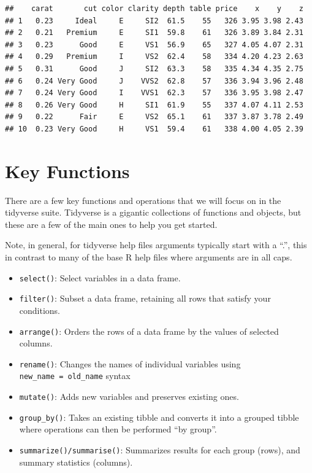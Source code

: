 \documentclass[
]{book}
\begin{document}
\begin{verbatim}
##    carat       cut color clarity depth table price    x    y    z
## 1   0.23     Ideal     E     SI2  61.5    55   326 3.95 3.98 2.43
## 2   0.21   Premium     E     SI1  59.8    61   326 3.89 3.84 2.31
## 3   0.23      Good     E     VS1  56.9    65   327 4.05 4.07 2.31
## 4   0.29   Premium     I     VS2  62.4    58   334 4.20 4.23 2.63
## 5   0.31      Good     J     SI2  63.3    58   335 4.34 4.35 2.75
## 6   0.24 Very Good     J    VVS2  62.8    57   336 3.94 3.96 2.48
## 7   0.24 Very Good     I    VVS1  62.3    57   336 3.95 3.98 2.47
## 8   0.26 Very Good     H     SI1  61.9    55   337 4.07 4.11 2.53
## 9   0.22      Fair     E     VS2  65.1    61   337 3.87 3.78 2.49
## 10  0.23 Very Good     H     VS1  59.4    61   338 4.00 4.05 2.39
\end{verbatim}

\hypertarget{key-functions}{%
\section{Key Functions}\label{key-functions}}

There are a few key functions and operations that we will focus on in the tidyverse suite. Tidyverse is a gigantic collections of functions and objects, but these are a few of the main ones to help you get started.

Note, in general, for tidyverse help files arguments typically start with a ``.'', this in contrast to many of the base R help files where arguments are in all caps.

\begin{itemize}
\item
  \texttt{select()}: Select variables in a data frame.
\item
  \texttt{filter()}: Subset a data frame, retaining all rows that satisfy your conditions.
\item
  \texttt{arrange()}: Orders the rows of a data frame by the values of selected columns.
\item
  \texttt{rename()}: Changes the names of individual variables using \texttt{new\_name\ =\ old\_name} syntax
\item
  \texttt{mutate()}: Adds new variables and preserves existing ones.
\item
  \texttt{group\_by()}: Takes an existing tibble and converts it into a grouped tibble where operations can then be performed ``by group''.
\item
  \texttt{summarize()/summarise()}: Summarizes results for each group (rows), and summary statistics (columns).
\end{itemize}
\end{document}
